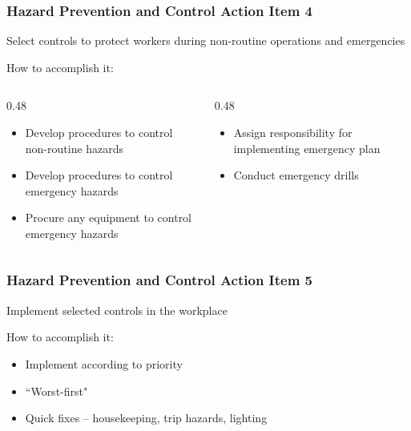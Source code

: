 \begin{frame}
	\frametitle{Hazard Prevention and Control Action Item 4}

    Select controls to protect workers during non-routine operations and emergencies

    \begin{block}{How to accomplish it:}
        \vspace{-1.5em}
        \begin{columns}[t]
            \begin{column}{0.48\linewidth}
                \begin{itemize}[<+- | alert@+>]
                    \item Develop procedures to control non-routine hazards
                    \item Develop procedures to control emergency hazards
                    \item Procure any equipment to control emergency hazards
                \end{itemize}
            \end{column}
            \begin{column}{0.48\linewidth}
                \begin{itemize}[<+- | alert@+>]
                    \item Assign responsibility for implementing emergency plan
                    \item Conduct emergency drills
                \end{itemize}
            \end{column}
        \end{columns}
    \end{block}
\end{frame}

\begin{frame}
	\frametitle{Hazard Prevention and Control Action Item 5}

    Implement selected controls in the workplace

    \begin{block}{How to accomplish it:}
        \begin{itemize}[<+- | alert@+>]
            \item Implement according to priority
            \item ``Worst-first"
            \item Quick fixes -- housekeeping, trip hazards, lighting
        \end{itemize}
    \end{block}
\end{frame}

